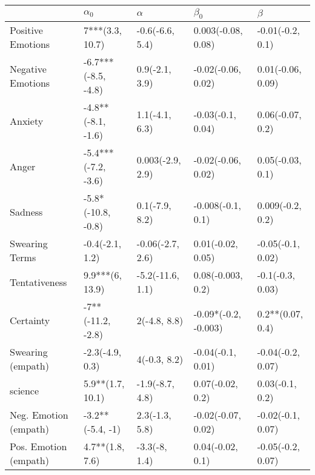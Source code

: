 \begin{tabular}{lllll}
\toprule
{} &           $\alpha_0$ &          $\alpha$ &             $\beta_0$ &            $\beta$ \\
\midrule
Positive Emotions     &      7***(3.3, 10.7) &   -0.6(-6.6, 5.4) &    0.003(-0.08, 0.08) &   -0.01(-0.2, 0.1) \\
Negative Emotions     &  -6.7***(-8.5, -4.8) &    0.9(-2.1, 3.9) &    -0.02(-0.06, 0.02) &  0.01(-0.06, 0.09) \\
Anxiety               &   -4.8**(-8.1, -1.6) &    1.1(-4.1, 6.3) &     -0.03(-0.1, 0.04) &   0.06(-0.07, 0.2) \\
Anger                 &  -5.4***(-7.2, -3.6) &  0.003(-2.9, 2.9) &    -0.02(-0.06, 0.02) &   0.05(-0.03, 0.1) \\
Sadness               &   -5.8*(-10.8, -0.8) &    0.1(-7.9, 8.2) &     -0.008(-0.1, 0.1) &   0.009(-0.2, 0.2) \\
Swearing Terms        &      -0.4(-2.1, 1.2) &  -0.06(-2.7, 2.6) &     0.01(-0.02, 0.05) &  -0.05(-0.1, 0.02) \\
Tentativeness         &      9.9***(6, 13.9) &  -5.2(-11.6, 1.1) &     0.08(-0.003, 0.2) &   -0.1(-0.3, 0.03) \\
Certainty             &    -7**(-11.2, -2.8) &      2(-4.8, 8.8) &  -0.09*(-0.2, -0.003) &   0.2**(0.07, 0.4) \\
Swearing (empath)     &      -2.3(-4.9, 0.3) &      4(-0.3, 8.2) &     -0.04(-0.1, 0.01) &  -0.04(-0.2, 0.07) \\
science               &     5.9**(1.7, 10.1) &   -1.9(-8.7, 4.8) &      0.07(-0.02, 0.2) &    0.03(-0.1, 0.2) \\
Neg. Emotion (empath) &     -3.2**(-5.4, -1) &    2.3(-1.3, 5.8) &    -0.02(-0.07, 0.02) &  -0.02(-0.1, 0.07) \\
Pos. Emotion (empath) &      4.7**(1.8, 7.6) &     -3.3(-8, 1.4) &      0.04(-0.02, 0.1) &  -0.05(-0.2, 0.07) \\
\bottomrule
\end{tabular}
